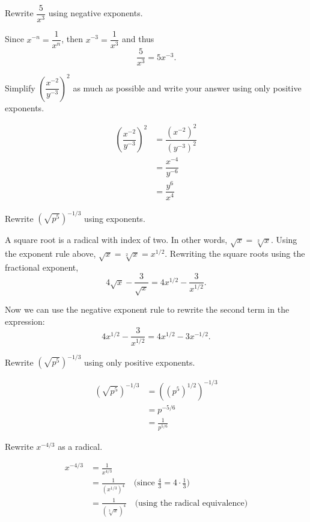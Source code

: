 \begin{example}
Rewrite \(\dfrac{5}{x^3}\) using negative exponents.

\solution Since \(x^{-n}=\dfrac{1}{x^n}\), then \(x^{-3}=\dfrac{1}{x^3}\) and thus
\[\dfrac{5}{x^3}=5x^{-3}.\]
\end{example}

\begin{example}
Simplify \(\left(\dfrac{x^{-2}}{y^{-3}}\right)^2\) as much as possible and write your answer using only positive exponents.

\solution
\begin{align*}
		\left(\dfrac{x^{-2}}{y^{-3}}\right)^2 &=  \dfrac{\left(x^{-2}\right)^2}{\left(y^{-3}\right)^2}\\
		 &=  \dfrac{x^{-4}}{y^{-6}}\\
		 &=  \dfrac{y^6}{x^4}
	\end{align*}
\end{example}

\begin{example}
Rewrite \( \left(\sqrt{p^5}\right)^{-1/3} \) using exponents.

\solution A square root is a radical with index of two. In other words, \(\sqrt{x}=\sqrt[2]{x}\). Using the exponent rule above, \(\sqrt{x}=\sqrt[2]{x}=x^{1/2}\). Rewriting the square roots using the fractional exponent, \[4\sqrt{x}-\dfrac{3}{\sqrt{x}}=4x^{1/2}-\dfrac{3}{x^{1/2}}.\]

Now we can use the negative exponent rule to rewrite the second term in the expression:
\[4x^{1/2}-\dfrac{3}{x^{1/2}}=4x^{1/2}-3x^{-1/2}.\]
\end{example}

\begin{example}
Rewrite \( \left(\sqrt{p^5}\right)^{-1/3} \) using only positive exponents.

\solution
  \begin{align*}
		\left(\sqrt{p^5}\right)^{-1/3} &=  \left(\left(p^5\right)^{1/2}\right)^{-1/3}\\
		 &=  p^{-5/6}\\
		 &=  \frac{1}{ p^{5/6}}
	\end{align*}
\end{example}

\begin{example}
Rewrite \( x^{-4/3} \) as a radical.

\solution
\begin{align*}
		x^{-4/3} &=  \frac{1}{x^{4/3}} \\
		 &=  \frac{1}{\left(x^{1/3}\right)^4} \quad \text{(since \(\frac{4}{3}=4\cdot\frac{1}{3}\))}\\
		 &=  \frac{1}{\left(\sqrt[3]{x}\right)^4} \quad \text{(using the radical equivalence)}
	\end{align*}
\end{example}

